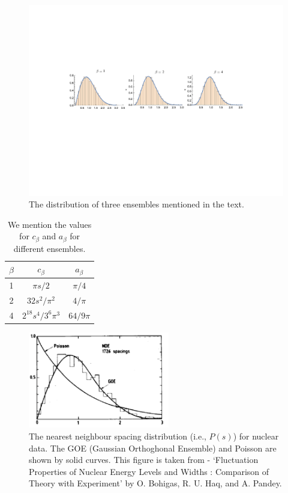 \documentclass[letter,11pt]{article}
\begin{document}
\begin{figure}[htbp] 
	\centering 
	\includegraphics[width=1.05\textwidth]{figs/ensem.pdf}
	\caption{\label{fig:ensem1}The distribution of three ensembles mentioned in the text.}
\end{figure}



\begin{table}[h!]
	\centering
	\begin{tabular}{||c c c||} 
		\hline
		$\beta$ & $c_{\beta}$ & $a_{\beta}$ \\ [0.5ex] 
		\hline\hline
		1 & $\pi s/2$ & $\pi/4$  \\ 
		2 & $32 s^2/\pi^2$ & $4/\pi$  \\
		4 & $2^{18} s^4/3^6 \pi^3$ & $64/9\pi$
		 \\ [1ex] 
		\hline 
	\end{tabular}
\caption{We mention the values for $c_{\beta}$ and $a_{\beta}$ for different ensembles.}
\label{table:c_and_a}
\end{table}


\begin{figure}[htbp] 
	\centering 
	\includegraphics[width=0.55\textwidth]{figs/data_exp.png}
	\caption{\label{fig:data_exp1}The nearest neighbour spacing distribution (i.e., $P(s)$) 
	for nuclear data. The GOE (Gaussian Orthoghonal Ensemble) and Poisson are shown 
	by solid curves. This figure is taken from - `Fluctuation Properties of Nuclear Energy 
	Levels and Widths : Comparison of Theory with Experiment' by O. Bohigas, R. U. 
	Haq, and A. Pandey.}
\end{figure}
\end{document}
